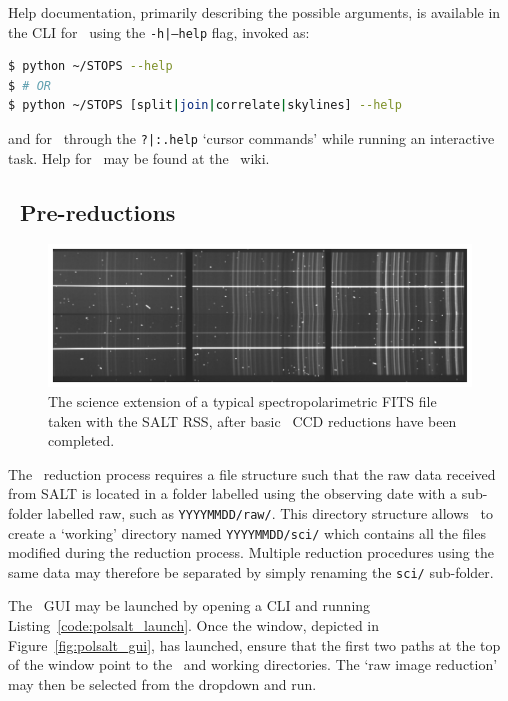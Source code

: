 Help documentation, primarily describing the possible arguments, is available in the \gls{CLI} for \stops\ using the \texttt{-h|--help} flag, invoked as:
\begin{lstlisting}[language=bash]
$ python ~/STOPS --help
$ # OR
$ python ~/STOPS [split|join|correlate|skylines] --help
\end{lstlisting}
{\parskip=0pt and} for \iraf\ through the \texttt{?|:.help} `cursor commands' while running an interactive task. Help for \polsalt\ may be found at the \polsalt\ wiki.

\subsection{\polsalt\ Pre-reductions}\label{subsec:reduc_pre}

\begin{figure}[t]
    \centering
    \includegraphics[width = 1.0\textwidth]{figures/3_pre_wav_cal.pdf}
    \caption{The science extension of a typical spectropolarimetric \acs{FITS} file taken with the \gls{SALT} \gls{RSS}, after basic \polsalt\ \gls{CCD} reductions have been completed.}
    \label{fig:polsalt_pre_wav_cal}
\end{figure}

The \polsalt\ reduction process requires a file structure such that the raw data received from \gls{SALT} is located in a folder labelled using the observing date with a sub-folder labelled raw, such as \texttt{YYYYMMDD/raw/}. This directory structure allows \polsalt\ to create a `working' directory named \texttt{YYYYMMDD/sci/} which contains all the files modified during the reduction process. Multiple reduction procedures using the same data may therefore be separated by simply renaming the \texttt{sci/} sub-folder.

The \polsalt\ \gls{GUI} may be launched by opening a \gls{CLI} and running Listing~\ref{code:polsalt_launch}. Once the window, depicted in Figure~\ref{fig:polsalt_gui}, has launched, ensure that the first two paths at the top of the window point to the \polsalt\ and working directories. The `raw image reduction' may then be selected from the dropdown and run.

